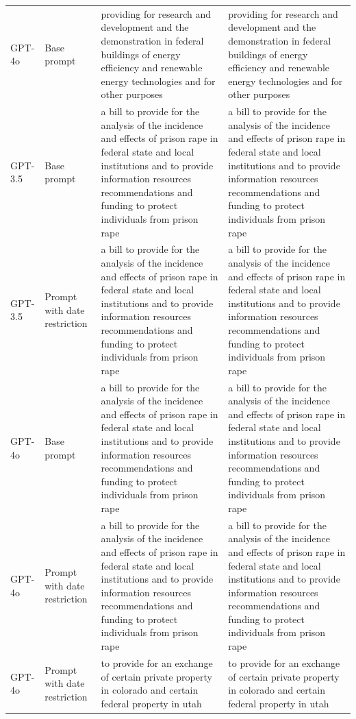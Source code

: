 \begin{longtable}{>{\raggedright\arraybackslash}p{1.4cm}>{\raggedright\arraybackslash}p{1.4cm}>{\raggedright\arraybackslash}p{5.5cm}>{\raggedright\arraybackslash}p{5.5cm}}
GPT-4o & Base prompt & providing for research and development and the demonstration in federal buildings of energy efficiency and renewable energy technologies and for other purposes & providing for research and development and the demonstration in federal buildings of energy efficiency and renewable energy technologies and for other purposes\\
GPT-3.5 & Base prompt & a bill to provide for the analysis of the incidence and effects of prison rape in federal state and local institutions and to provide information resources recommendations and funding to protect individuals from prison rape & a bill to provide for the analysis of the incidence and effects of prison rape in federal state and local institutions and to provide information resources recommendations and funding to protect individuals from prison rape\\
GPT-3.5 & Prompt with date restriction & a bill to provide for the analysis of the incidence and effects of prison rape in federal state and local institutions and to provide information resources recommendations and funding to protect individuals from prison rape & a bill to provide for the analysis of the incidence and effects of prison rape in federal state and local institutions and to provide information resources recommendations and funding to protect individuals from prison rape\\
GPT-4o & Base prompt & a bill to provide for the analysis of the incidence and effects of prison rape in federal state and local institutions and to provide information resources recommendations and funding to protect individuals from prison rape & a bill to provide for the analysis of the incidence and effects of prison rape in federal state and local institutions and to provide information resources recommendations and funding to protect individuals from prison rape\\
GPT-4o & Prompt with date restriction & a bill to provide for the analysis of the incidence and effects of prison rape in federal state and local institutions and to provide information resources recommendations and funding to protect individuals from prison rape & a bill to provide for the analysis of the incidence and effects of prison rape in federal state and local institutions and to provide information resources recommendations and funding to protect individuals from prison rape\\
GPT-4o & Prompt with date restriction & to provide for an exchange of certain private property in colorado and certain federal property in utah & to provide for an exchange of certain private property in colorado and certain federal property in utah\\

\end{longtable}
